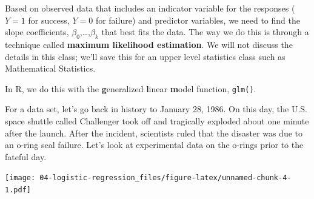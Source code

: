 \documentclass[
]{book}
\newenvironment{Shaded}{\begin{snugshade}}{\end{snugshade}}
\newcommand{\DataTypeTok}[1]{\textcolor[rgb]{0.13,0.29,0.53}{#1}}
\newcommand{\KeywordTok}[1]{\textcolor[rgb]{0.13,0.29,0.53}{\textbf{#1}}}
\newcommand{\NormalTok}[1]{#1}
\newcommand{\OperatorTok}[1]{\textcolor[rgb]{0.81,0.36,0.00}{\textbf{#1}}}
\newcommand{\StringTok}[1]{\textcolor[rgb]{0.31,0.60,0.02}{#1}}
\begin{document}
Based on observed data that includes an indicator variable for the responses (\(Y=1\) for success, \(Y=0\) for failure) and predictor variables, we need to find the slope coefficients, \(\beta_0\),\ldots,\(\beta_k\) that best fits the data. The way we do this is through a technique called \textbf{maximum likelihood estimation}. We will not discuss the details in this class; we'll save this for an upper level statistics class such as Mathematical Statistics.

In R, we do this with the \textbf{g}eneralized \textbf{l}inear \textbf{m}odel function, \texttt{glm()}.

For a data set, let's go back in history to January 28, 1986. On this day, the U.S. space shuttle called Challenger took off and tragically exploded about one minute after the launch. After the incident, scientists ruled that the disaster was due to an o-ring seal failure. Let's look at experimental data on the o-rings prior to the fateful day.

\begin{Shaded}
\end{Shaded}

\texttt{[image: 04-logistic-regression\_files/figure-latex/unnamed-chunk-4-1.pdf]}

\begin{Shaded}
\end{Shaded}
\end{document}
